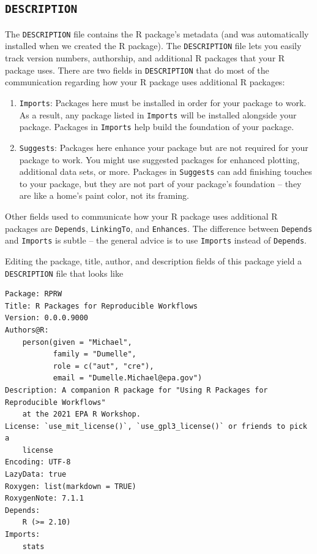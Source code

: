 \documentclass[
]{book}
\begin{document}
\hypertarget{description}{%
\subsection{\texorpdfstring{\texttt{DESCRIPTION}}{DESCRIPTION}}\label{description}}

The \texttt{DESCRIPTION} file contains the R package's metadata (and was automatically installed when we created the R package). The \texttt{DESCRIPTION} file lets you easily track version numbers, authorship, and additional R packages that your R package uses. There are two fields in \texttt{DESCRIPTION} that do most of the communication regarding how your R package uses additional R packages:

\begin{enumerate}
\def\labelenumi{\arabic{enumi}.}
\item
  \texttt{Imports}: Packages here must be installed in order for your package to work. As a result, any package listed in \texttt{Imports} will be installed alongside your package. Packages in \texttt{Imports} help build the foundation of your package.
\item
  \texttt{Suggests}: Packages here enhance your package but are not required for your package to work. You might use suggested packages for enhanced plotting, additional data sets, or more. Packages in \texttt{Suggests} can add finishing touches to your package, but they are not part of your package's foundation -- they are like a home's paint color, not its framing.
\end{enumerate}

Other fields used to communicate how your R package uses additional R packages are \texttt{Depends}, \texttt{LinkingTo}, and \texttt{Enhances}. The difference between \texttt{Depends} and \texttt{Imports} is subtle -- the general advice is to use \texttt{Imports} instead of \texttt{Depends}.

Editing the package, title, author, and description fields of this package yield a \texttt{DESCRIPTION} file that looks like

\begin{verbatim}
Package: RPRW
Title: R Packages for Reproducible Workflows
Version: 0.0.0.9000
Authors@R: 
    person(given = "Michael",
           family = "Dumelle",
           role = c("aut", "cre"),
           email = "Dumelle.Michael@epa.gov")
Description: A companion R package for "Using R Packages for Reproducible Workflows"
    at the 2021 EPA R Workshop.
License: `use_mit_license()`, `use_gpl3_license()` or friends to pick a
    license
Encoding: UTF-8
LazyData: true
Roxygen: list(markdown = TRUE)
RoxygenNote: 7.1.1
Depends: 
    R (>= 2.10)
Imports: 
    stats
\end{verbatim}
\end{document}
